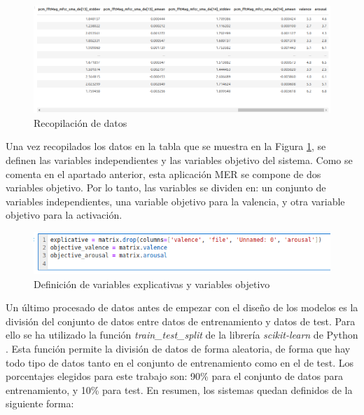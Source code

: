 \documentclass[12pt,a4paper,Spanish]{article}
\begin{document}
\begin{figure}[H]
	\centering
	\includegraphics[width=0.7\linewidth]{figs/data}
	\caption{Recopilación de datos}
	\label{fig:data}
\end{figure}
Una vez recopilados los datos en la tabla que se muestra en la Figura \ref{fig:data}, se definen las variables independientes y las variables objetivo del sistema. Como se comenta en el apartado anterior, esta aplicación MER se compone de dos variables objetivo. Por lo tanto, las variables se dividen en: un conjunto de variables independientes, una variable objetivo para la valencia, y otra variable objetivo para la activación.
\begin{figure}[H]
	\centering
	\includegraphics[width=0.7\linewidth]{figs/variables}
	\caption{Definición de variables explicativas y variables objetivo}
	\label{fig:variables}
\end{figure}
Un último procesado de datos antes de empezar con el diseño de los modelos es la división del conjunto de datos entre datos de entrenamiento y datos de test. Para ello se ha utilizado la función \textit{train\_test\_split} de la librería \textit{scikit-learn} de Python \cite{scikit-learn}. Esta función permite la división de datos de forma aleatoria, de forma que hay todo tipo de datos tanto en el conjunto de entrenamiento como en el de test. Los porcentajes elegidos para este trabajo son: 90\% para el conjunto de datos para entrenamiento, y 10\% para test.
\newline
En resumen, los sistemas quedan definidos de la siguiente forma:
\end{document}
